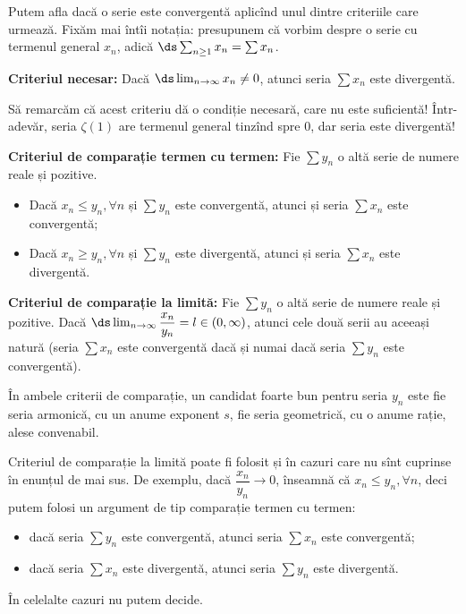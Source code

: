 Putem afla dacă o serie este convergentă aplicînd unul dintre criteriile care urmează.
Fixăm mai întîi notația: presupunem că vorbim despre o serie cu termenul general
$ x_n $, adică $ \ds\sum_{n \geq 1} x_n = \sum x_n $.

\textbf{Criteriul necesar:} Dacă $ \ds\lim_{n \to \infty} x_n \neq 0 $, atunci
seria $ \sum x_n $ este divergentă.

\begin{remark}\label{rk:nec}
    Să remarcăm că acest criteriu dă o condiție necesară, care nu este suficientă!
    Într-adevăr, seria $ \zeta(1) $ are termenul general tinzînd spre 0, dar seria
    este divergentă!
\end{remark}

\vspace{1cm}

\textbf{Criteriul de comparație termen cu termen:} Fie $ \sum y_n $ o altă serie
de numere reale și pozitive.
\begin{itemize}
    \item Dacă $ x_n \leq y_n, \forall n $ și $ \sum y_n $ este convergentă,
        atunci și seria $ \sum x_n $ este convergentă;
    \item Dacă $ x_n \geq y_n, \forall n $ și $ \sum y_n $ este divergentă,
        atunci și seria $ \sum x_n $ este divergentă.
\end{itemize}

\vspace{1cm}

\textbf{Criteriul de comparație la limită:} Fie $ \sum y_n $ o altă serie
de numere reale și pozitive. Dacă $ \ds\lim_{n \to \infty} \dfrac{x_n}{y_n} = l \in (0, \infty) $,
atunci cele două serii au aceeași natură (seria $ \sum x_n $ este convergentă
dacă și numai dacă seria $ \sum y_n $ este convergentă).

\begin{remark}\label{rk:comparatie}
    În ambele criterii de comparație, un candidat foarte bun pentru seria $ y_n $
    este fie seria armonică, cu un anume exponent $ s $, fie seria geometrică,
    cu o anume rație, alese convenabil.
\end{remark}

\begin{remark}\label{rk:comp-alte-cazuri}
    Criteriul de comparație la limită poate fi folosit și în cazuri care nu sînt
    cuprinse în enunțul de mai sus. De exemplu, dacă $ \dfrac{x_n}{y_n} \to 0 $,
    înseamnă că $ x_n \leq y_n, \forall n $, deci putem folosi un argument de tip
    comparație termen cu termen: 
    \begin{itemize}
        \item dacă seria $ \sum y_n $ este convergentă, atunci seria $ \sum x_n $ 
            este convergentă; 
        \item dacă seria $ \sum x_n $ este divergentă, atunci seria $ \sum y_n $ 
            este divergentă.
    \end{itemize}
    În celelalte cazuri nu putem decide.
\end{remark}

